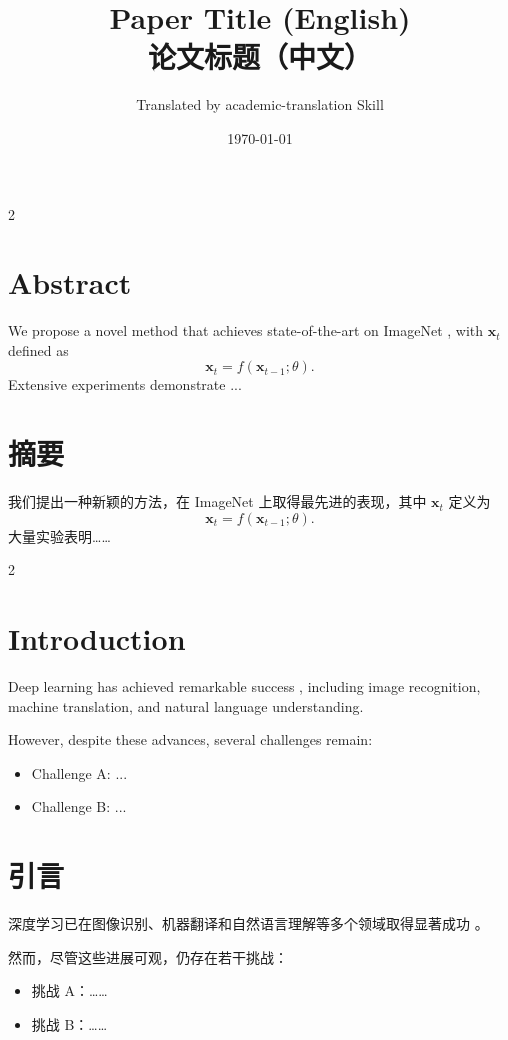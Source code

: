 \documentclass[11pt,a4paper]{article}
\title{{Paper Title (English)} \\ {论文标题（中文）}}
\author{Translated by academic-translation Skill}
\date{\today}
\begin{document}
\maketitle

\begin{paracol}{2}
\section*{Abstract}
We propose a novel method that achieves state-of-the-art on
ImageNet \cite{deng2009imagenet}, with $\mathbf{x}_t$ defined as
\begin{equation}
  \mathbf{x}_t = f(\mathbf{x}_{t-1}; \theta).
\end{equation}
Extensive experiments demonstrate ...

\switchcolumn

\section*{摘要}
我们提出一种新颖的方法，在 ImageNet \cite{deng2009imagenet}
上取得最先进的表现，其中 $\mathbf{x}_t$ 定义为
\begin{equation}
  \mathbf{x}_t = f(\mathbf{x}_{t-1}; \theta).
\end{equation}
大量实验表明……
\end{paracol}

\begin{paracol}{2}
\section{Introduction}
Deep learning has achieved remarkable success
\cite{lecun2015deep}, including image recognition,
machine translation, and natural language understanding.

However, despite these advances, several challenges remain:
\begin{itemize}
  \item Challenge A: ...
  \item Challenge B: ...
\end{itemize}

\switchcolumn

\section{引言}
深度学习已在图像识别、机器翻译和自然语言理解等多个领域取得显著成功
\cite{lecun2015deep}。

然而，尽管这些进展可观，仍存在若干挑战：
\begin{itemize}
  \item 挑战 A：……
  \item 挑战 B：……
\end{itemize}
\end{paracol}


\end{document}
